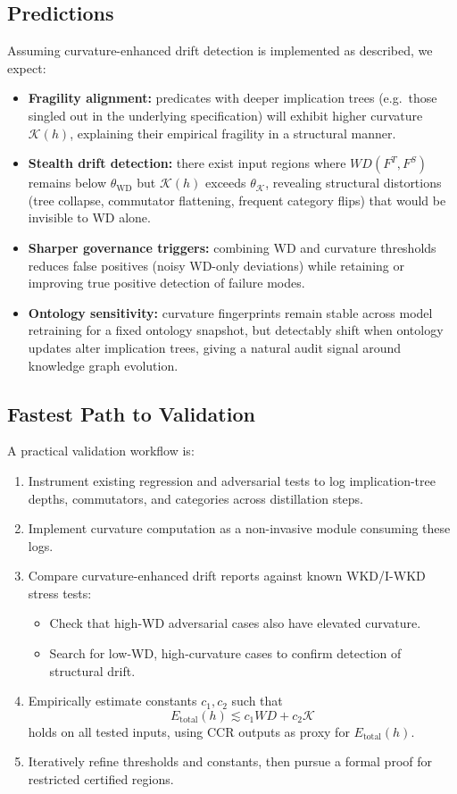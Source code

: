 \documentclass[11pt]{article}
\theoremstyle{definition}
\theoremstyle{plain}
\theoremstyle{remark}
\begin{document}
\subsection{Predictions}

Assuming curvature-enhanced drift detection is implemented as described, we expect:

\begin{itemize}[leftmargin=2em]
  \item \textbf{Fragility alignment:} predicates with deeper implication trees (e.g.\ those singled out in the underlying specification) will exhibit higher curvature \(\mathcal{K}(h)\), explaining their empirical fragility in a structural manner.
  \item \textbf{Stealth drift detection:} there exist input regions where \(WD(F^T,F^S)\) remains below \(\theta_{\text{WD}}\) but \(\mathcal{K}(h)\) exceeds \(\theta_{\mathcal{K}}\), revealing structural distortions (tree collapse, commutator flattening, frequent category flips) that would be invisible to WD alone.
  \item \textbf{Sharper governance triggers:} combining WD and curvature thresholds reduces false positives (noisy WD-only deviations) while retaining or improving true positive detection of failure modes.
  \item \textbf{Ontology sensitivity:} curvature fingerprints remain stable across model retraining for a fixed ontology snapshot, but detectably shift when ontology updates alter implication trees, giving a natural audit signal around knowledge graph evolution.
\end{itemize}

\subsection{Fastest Path to Validation}

A practical validation workflow is:
\begin{enumerate}[leftmargin=2em]
  \item Instrument existing regression and adversarial tests to log implication-tree depths, commutators, and categories across distillation steps.
  \item Implement curvature computation as a non-invasive module consuming these logs.
  \item Compare curvature-enhanced drift reports against known WKD/I-WKD stress tests:
  \begin{itemize}
      \item Check that high-WD adversarial cases also have elevated curvature.
      \item Search for low-WD, high-curvature cases to confirm detection of structural drift.
  \end{itemize}
  \item Empirically estimate constants \(c_1,c_2\) such that
  \[
    E_{\text{total}}(h) \lesssim c_1 WD + c_2 \mathcal{K}
  \]
  holds on all tested inputs, using CCR outputs as proxy for \(E_{\text{total}}(h)\).
  \item Iteratively refine thresholds and constants, then pursue a formal proof for restricted certified regions.
\end{enumerate}
\end{document}
